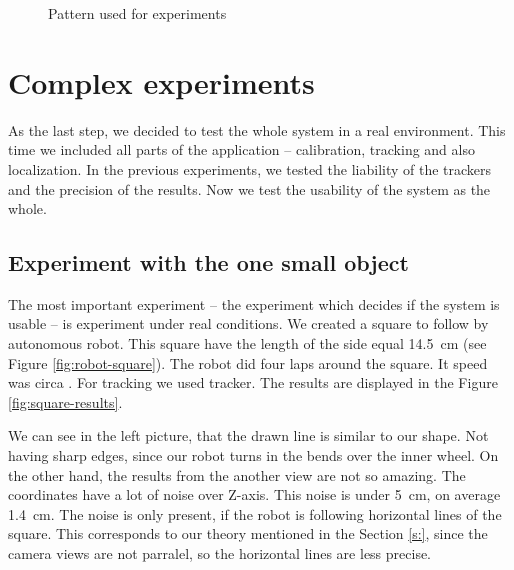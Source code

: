 \begin{figure}
\centering
{}
\caption{Pattern used for experiments}
\label{fig:grid}
\end{figure}

\section{Complex experiments}

As the last step, we decided to test the whole system in a real environment. This
time we included all parts of the application -- calibration, tracking and also
localization. In the previous experiments, we tested the liability of the
trackers and the precision of the results. Now we test the usability of the
system as the whole.

\subsection{Experiment with the one small object}

The most important experiment -- the experiment which decides if the system is
usable -- is experiment under real conditions. We created a square to follow by
autonomous robot. This square have the length of the side equal 14.5~cm (see
Figure \ref{fig:robot-square}). The robot did four laps around the square. It
speed was circa . For tracking we used \hsv{}
tracker. The results are displayed in the Figure \ref{fig:square-results}.

We can see in the left picture, that the drawn line is similar to our shape.
Not having sharp edges, since our robot turns in the bends over the inner
wheel. On the other hand, the results from the another view are not so amazing.
The coordinates have a lot of noise over Z-axis. This noise is under 5~cm, on
average 1.4~cm. The noise is only present, if the robot is following horizontal
lines of the square. This corresponds to our theory mentioned in the Section
\ref{s:}, since the camera views are not parralel, so the horizontal lines are
less precise.


